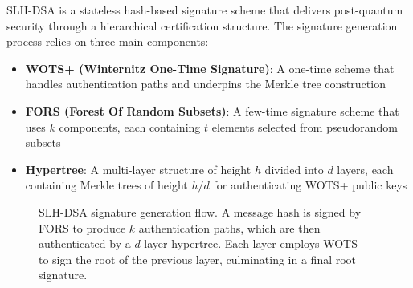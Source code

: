 \documentclass[journal]{IEEEtran}
\begin{document}
SLH-DSA is a stateless hash-based signature scheme that delivers post-quantum security through a hierarchical certification structure. The signature generation process relies on three main components:

\begin{itemize}
  \item \textbf{WOTS+ (Winternitz One-Time Signature)}: A one-time scheme that handles authentication paths and underpins the Merkle tree construction
  \item \textbf{FORS (Forest Of Random Subsets)}: A few-time signature scheme that uses $k$ components, each containing $t$ elements selected from pseudorandom subsets
  \item \textbf{Hypertree}: A multi-layer structure of height $h$ divided into $d$ layers, each containing Merkle trees of height $h/d$ for authenticating WOTS+ public keys
\end{itemize}

\begin{figure}[t]
  \centering
  \caption{SLH-DSA signature generation flow. A message hash is signed by FORS to produce $k$ authentication paths, which are then authenticated by a $d$-layer hypertree. Each layer employs WOTS+ to sign the root of the previous layer, culminating in a final root signature.}
  \label{fig:sphincs-process}
\end{figure}
\end{document}
